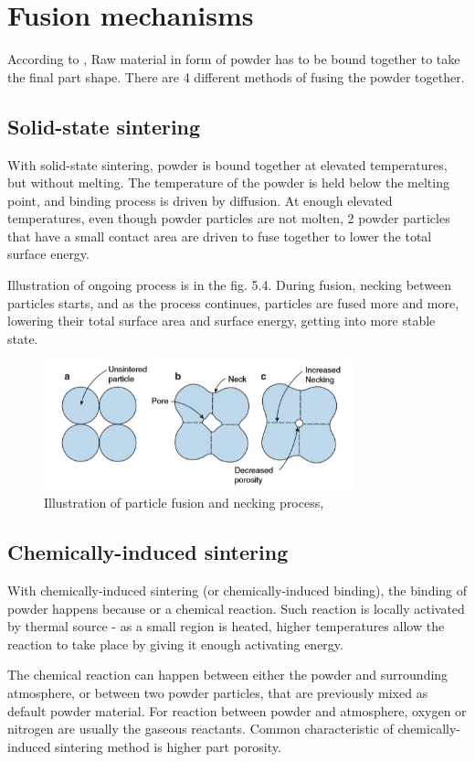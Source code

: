 \documentclass[a4paper, 11pt, reqno]{report}
\begin{document}
\section{Fusion mechanisms}
	According to \cite{AMT}, Raw material in form of powder has to be bound together to take the final part shape. There are 4 different methods of  fusing the powder together.
\subsection{Solid-state sintering}
With solid-state sintering, powder is bound together at elevated temperatures, but without melting. The temperature of the powder is held below the melting point, and binding process is driven by diffusion. At enough elevated temperatures, even though powder particles are not molten, 2 powder particles that have a small contact area are driven to fuse together to lower the total surface energy.

	Illustration of ongoing process is in the fig. 5.4. During fusion, necking between particles starts, and as the process continues, particles are fused more and more, lowering their total surface area and surface energy, getting into more stable state.\\
\begin{figure}[t]
	\centering
 	\includegraphics[width=0.8\textwidth]{necking}
	\caption{Illustration of particle fusion and necking process, \cite[p. 113]{AMT} }
\end{figure}

\subsection{Chemically-induced sintering}
With chemically-induced sintering (or chemically-induced binding), the binding of powder happens because or a chemical reaction. Such reaction is locally activated by thermal source - as a small region is heated, higher temperatures allow the reaction to take place by giving it enough activating energy.

	The chemical reaction can happen between either the powder and surrounding atmosphere, or between two powder particles, that are previously mixed as default powder material. For reaction between powder and atmosphere, oxygen or nitrogen are usually the gaseous reactants. Common characteristic of chemically-induced sintering method is higher part porosity.
	
\end{document}
